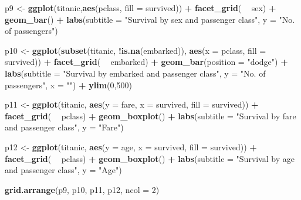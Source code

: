 \documentclass[12,]{article}
\newenvironment{Shaded}{\begin{snugshade}}{\end{snugshade}}
\newcommand{\KeywordTok}[1]{\textcolor[rgb]{0.13,0.29,0.53}{\textbf{#1}}}
\newcommand{\DataTypeTok}[1]{\textcolor[rgb]{0.13,0.29,0.53}{#1}}
\newcommand{\DecValTok}[1]{\textcolor[rgb]{0.00,0.00,0.81}{#1}}
\newcommand{\StringTok}[1]{\textcolor[rgb]{0.31,0.60,0.02}{#1}}
\newcommand{\OperatorTok}[1]{\textcolor[rgb]{0.81,0.36,0.00}{\textbf{#1}}}
\newcommand{\NormalTok}[1]{#1}
\begin{document}
\begin{Shaded}
\begin{Highlighting}[]
\NormalTok{p9 <-}\StringTok{ }\KeywordTok{ggplot}\NormalTok{(titanic,}\KeywordTok{aes}\NormalTok{(pclass, }\DataTypeTok{fill =}\NormalTok{ survived)) }\OperatorTok{+}\StringTok{ }
\StringTok{    }\KeywordTok{facet_grid}\NormalTok{( }\OperatorTok{~}\StringTok{ }\NormalTok{sex) }\OperatorTok{+}\StringTok{ }
\StringTok{    }\KeywordTok{geom_bar}\NormalTok{() }\OperatorTok{+}\StringTok{ }\KeywordTok{labs}\NormalTok{(}\DataTypeTok{subtitle =} \StringTok{"Survival by sex and passenger class"}\NormalTok{,}
                      \DataTypeTok{y =} \StringTok{"No. of passengers"}\NormalTok{)}

\NormalTok{p10 <-}\StringTok{ }\KeywordTok{ggplot}\NormalTok{(}\KeywordTok{subset}\NormalTok{(titanic, }\OperatorTok{!}\KeywordTok{is.na}\NormalTok{(embarked)), }\KeywordTok{aes}\NormalTok{(}\DataTypeTok{x =}\NormalTok{ pclass, }\DataTypeTok{fill =}\NormalTok{ survived)) }\OperatorTok{+}
\StringTok{    }\KeywordTok{facet_grid}\NormalTok{( }\OperatorTok{~}\StringTok{ }\NormalTok{embarked) }\OperatorTok{+}\StringTok{ }\KeywordTok{geom_bar}\NormalTok{(}\DataTypeTok{position =} \StringTok{"dodge"}\NormalTok{) }\OperatorTok{+}\StringTok{ }
\StringTok{    }\KeywordTok{labs}\NormalTok{(}\DataTypeTok{subtitle =} \StringTok{"Survival by embarked and passenger class"}\NormalTok{, }
         \DataTypeTok{y =} \StringTok{"No. of passengers"}\NormalTok{, }\DataTypeTok{x =} \StringTok{""}\NormalTok{) }\OperatorTok{+}\StringTok{ }\KeywordTok{ylim}\NormalTok{(}\DecValTok{0}\NormalTok{,}\DecValTok{500}\NormalTok{)}

\NormalTok{p11 <-}\StringTok{ }\KeywordTok{ggplot}\NormalTok{(titanic, }\KeywordTok{aes}\NormalTok{(}\DataTypeTok{y =}\NormalTok{ fare, }\DataTypeTok{x =}\NormalTok{ survived, }\DataTypeTok{fill =}\NormalTok{ survived)) }\OperatorTok{+}
\StringTok{    }\KeywordTok{facet_grid}\NormalTok{( }\OperatorTok{~}\StringTok{ }\NormalTok{pclass) }\OperatorTok{+}\StringTok{ }
\StringTok{    }\KeywordTok{geom_boxplot}\NormalTok{() }\OperatorTok{+}\StringTok{ }
\StringTok{    }\KeywordTok{labs}\NormalTok{(}\DataTypeTok{subtitle =} \StringTok{"Survival by fare and passenger class"}\NormalTok{,}
         \DataTypeTok{y =} \StringTok{"Fare"}\NormalTok{) }

\NormalTok{p12 <-}\StringTok{ }\KeywordTok{ggplot}\NormalTok{(titanic, }\KeywordTok{aes}\NormalTok{(}\DataTypeTok{y =}\NormalTok{ age, }\DataTypeTok{x =}\NormalTok{ survived, }\DataTypeTok{fill =}\NormalTok{ survived)) }\OperatorTok{+}
\StringTok{    }\KeywordTok{facet_grid}\NormalTok{( }\OperatorTok{~}\StringTok{ }\NormalTok{pclass) }\OperatorTok{+}\StringTok{ }\KeywordTok{geom_boxplot}\NormalTok{() }\OperatorTok{+}\StringTok{ }
\StringTok{    }\KeywordTok{labs}\NormalTok{(}\DataTypeTok{subtitle =} \StringTok{"Survival by age and passenger class"}\NormalTok{,}
         \DataTypeTok{y =} \StringTok{"Age"}\NormalTok{) }

\KeywordTok{grid.arrange}\NormalTok{(p9, p10, p11, p12, }\DataTypeTok{ncol =} \DecValTok{2}\NormalTok{)}
\end{Highlighting}
\end{Shaded}
\end{document}
